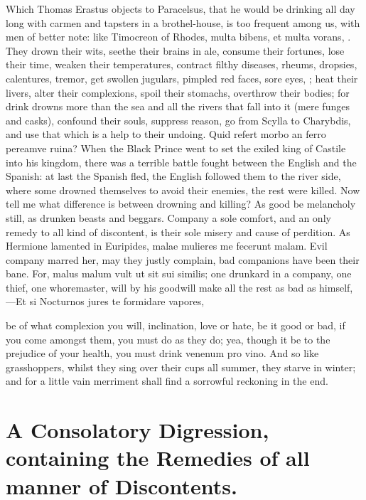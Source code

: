 {Which Thomas Erastus objects to Paracelsus, that he would be drinking
all day long with carmen and tapsters in a brothel-house, is too
frequent among us, with men of better note: like Timocreon of Rhodes,
multa bibens, et multa vorans, \etc{}. They drown their wits, seethe their
brains in ale, consume their fortunes, lose their time, weaken their
temperatures, contract filthy diseases, rheums, dropsies, calentures,
tremor, get swollen jugulars, pimpled red faces, sore eyes, \etc{}; heat
their livers, alter their complexions, spoil their stomachs, overthrow
their bodies; for drink drowns more than the sea and all the rivers
that fall into it (mere funges and casks), confound their souls,
suppress reason, go from Scylla to Charybdis, and use that which is a
help to their undoing. Quid refert morbo an ferro pereamve ruina?
When the Black Prince went to set the exiled king of Castile into
his kingdom, there was a terrible battle fought between the English and
the Spanish: at last the Spanish fled, the English followed them to the
river side, where some drowned themselves to avoid their enemies, the
rest were killed. Now tell me what difference is between drowning and
killing? As good be melancholy still, as drunken beasts and beggars.
Company a sole comfort, and an only remedy to all kind of discontent,
is their sole misery and cause of perdition. As Hermione lamented in
Euripides, malae mulieres me fecerunt malam. Evil company marred her,
may they justly complain, bad companions have been their bane. For,
malus malum vult ut sit sui similis; one drunkard in a company,
one thief, one whoremaster, will by his goodwill make all the rest as
bad as himself,
---Et si
Nocturnos jures te formidare vapores,

be of what complexion you will, inclination, love or hate, be it good
or bad, if you come amongst them, you must do as they do; yea,
though it be to the prejudice of your health, you must drink
venenum pro vino. And so like grasshoppers, whilst they sing over their
cups all summer, they starve in winter; and for a little vain merriment
shall find a sorrowful reckoning in the end.



\section[A Consolatory Digression]{A Consolatory Digression, containing the Remedies of all manner of Discontents.}

}
